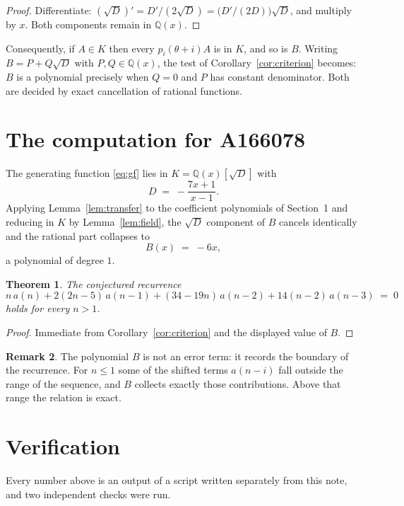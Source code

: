 \documentclass[11pt,a4paper]{article}
\theoremstyle{plain}
\newtheorem{theorem}{Theorem}
\theoremstyle{definition}
\newtheorem{remark}[theorem]{Remark}
\begin{document}
\begin{proof}
Differentiate: $(\sqrt{D})'=D'/(2\sqrt{D})=\bigl(D'/(2D)\bigr)\sqrt{D}$, and multiply by
$x$. Both components remain in $\mathbb{Q}(x)$.
\end{proof}

Consequently, if $A\in K$ then every $p_{i}(\theta+i)A$ is in $K$, and so is $B$. Writing
$B=P+Q\sqrt{D}$ with $P,Q\in\mathbb{Q}(x)$, the test of Corollary~\ref{cor:criterion}
becomes: $B$ is a polynomial precisely when $Q=0$ and $P$ has constant denominator. Both
are decided by exact cancellation of rational functions.

\section{The computation for A166078}

The generating function \eqref{eq:gf} lies in $K=\mathbb{Q}(x)[\sqrt{D}]$ with
\[
D \;=\; - \frac{7 x + 1}{x - 1} .
\]
Applying Lemma~\ref{lem:transfer} to the coefficient polynomials of Section~1 and reducing
in $K$ by Lemma~\ref{lem:field}, the $\sqrt{D}$ component of $B$ cancels identically and
the rational part collapses to
\[
B(x)\;=\;- 6 x ,
\]
a polynomial of degree $1$.

\begin{theorem}
The conjectured recurrence
\[
n\,a(n) + 2 \left(2 n - 5\right)\,a(n-1) + (34 - 19 n)\,a(n-2) + 14 \left(n - 2\right)\,a(n-3) \;=\;0
\]
holds for every $n>1$.
\end{theorem}

\begin{proof}
Immediate from Corollary~\ref{cor:criterion} and the displayed value of $B$.
\end{proof}

\begin{remark}
The polynomial $B$ is not an error term: it records the boundary of the recurrence. For
$n\le1$ some of the shifted terms $a(n-i)$ fall outside the range of the sequence,
and $B$ collects exactly those contributions. Above that range the relation is exact.
\end{remark}

\section{Verification}

Every number above is an output of a script written separately from this note, and two
independent checks were run.
\end{document}
